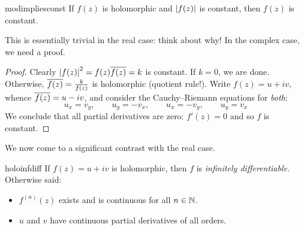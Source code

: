 


\begin{cor}{}{modimpliesconst}
If $f(z)$ is holomorphic and $\left| f(z)\right|$ is constant, then $f(z)$ is constant. 
\end{cor}

This is essentially trivial in the real case: think about why! In the complex case, we need a proof.

\begin{proof}
Clearly $\left| f(z)\right|^2=f(z)\overline{f(z)}=k$ is constant. If $k=0$, we are done. Otherwise, $\overline{f(z)}=\frac k{f(z)}$ is holomorphic (quotient rule!). Write $f(z)=u+iv$, whence $\overline{f(z)}=u-iv$, and consider the Cauchy--Riemann equations for \emph{both}:
\[u_x=v_y,\qquad u_y=-v_x,\qquad u_x=-v_y,\qquad u_y=v_x\]
We conclude that all partial derivatives are zero: $f'(z)=0$ and so $f$ is constant.
\end{proof}

We now come to a significant contrast with the real case. 

\begin{thm}{}{holoinfdiff}
If $f(z)=u+iv$ is holomorphic, then $f$ is \emph{infinitely differentiable.} Otherwise said:
\begin{itemize}
  \item $f^{(n)}(z)$ exists and is continuous for all $n\in\mathbb{N}$.
  \item $u$ and $v$ have continuous partial derivatives of all orders.
\end{itemize} 
\end{thm}

